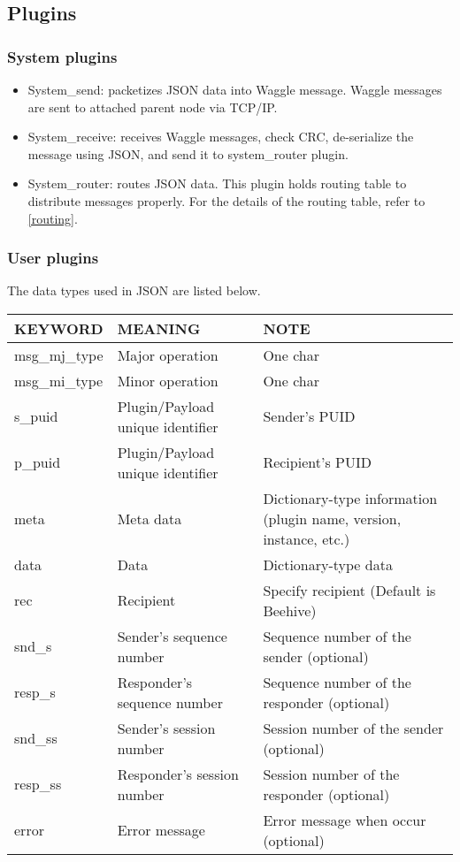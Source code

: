 \subsection{Plugins}

\subsubsection{System plugins}

\begin{itemize}
\item {System\_send: } packetizes JSON data into Waggle message. Waggle messages are sent to attached parent node via TCP/IP.
\item {System\_receive: } receives Waggle messages, check CRC, de-serialize the message using JSON, and send it to system\_router plugin. 
\item {System\_router: } routes JSON data. This plugin holds routing table to distribute messages properly. For the details of the routing table, refer to 
\ref{routing}.
\end{itemize}

\subsubsection{User plugins}



The data types used in JSON are listed below.
\label{json_keywords}
\begin{center}
    \begin{tabular}{ | p{3cm} | p{3cm} | p{8cm} |}
    \hline
    \hline
    \textbf{KEYWORD} & \textbf{MEANING} & \textbf{NOTE} \\ \hline \hline
    msg\_mj\_type & Major operation & One char \\  \hline
    msg\_mi\_type & Minor operation & One char \\  \hline
    s\_puid & Plugin/Payload unique identifier & Sender's PUID  \\  \hline
    p\_puid & Plugin/Payload unique identifier & Recipient's PUID  \\  \hline
    meta & Meta data & Dictionary-type information (plugin name, version, instance, etc.)  \\  \hline
    data & Data & Dictionary-type data  \\  \hline
    rec & Recipient & Specify recipient (Default is Beehive) \\ \hline
    snd\_s & Sender's sequence number & Sequence number of the sender (optional) \\ \hline
    resp\_s & Responder's sequence number & Sequence number of the responder (optional) \\ \hline
    snd\_ss & Sender's session number & Session number of the sender (optional) \\ \hline
    resp\_ss & Responder's session number & Session number of the responder (optional) \\ \hline
    error & Error message & Error message when occur (optional) \\ \hline
    \end{tabular}
\end{center}

